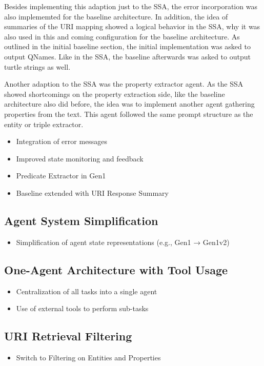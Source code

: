 \documentclass[a4paper,oneside,bibliography=totoc]{scrbook}
\begin{document}
Besides implementing this adaption just to the \ac{SSA}, the error incorporation was also implememted for the baseline architecture. In addition, the idea of summaries of the URI mapping showed a logical behavior in the \ac{SSA}, why it was also used in this and coming configuration for the baseline architecture. As outlined in the initial baseline section, the initial implementation was asked to output QNames. Like in the \ac{SSA}, the baseline afterwards was asked to output turtle strings as well.

Another adaption to the \ac{SSA} was the property extractor agent. As the \ac{SSA} showed shortcomings on the property extraction side, like the baseline architecture also did before, the idea was to implement another agent gathering properties from the text. This agent followed the same prompt structure as the entity or triple extractor.

\begin{itemize}
  \item Integration of error messages
  \item Improved state monitoring and feedback
  \item Predicate Extractor in Gen1
  \item Baseline extended with URI Response Summary
\end{itemize}

\subsection{Agent System Simplification}
\label{subsec:task_simplification_state_refinement}
\begin{itemize}
  \item Simplification of agent state representations (e.g., Gen1 → Gen1v2)
\end{itemize}

\subsection{One-Agent Architecture with Tool Usage}
\label{subsec:one_agent_architecture_tool_usage}
\begin{itemize}
  \item Centralization of all tasks into a single agent
  \item Use of external tools to perform sub-tasks
\end{itemize}

\subsection{URI Retrieval Filtering}
\label{subsec:uri_retrieval_filtering}
\begin{itemize}
  \item Switch to Filtering on Entities and Properties
\end{itemize}
\end{document}
